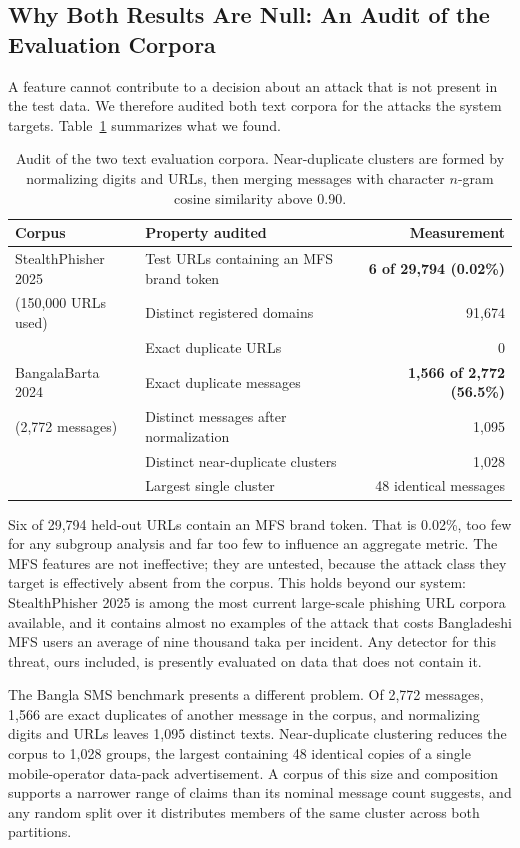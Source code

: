 \documentclass[preprint,12pt,number]{elsarticle}
\begin{document}
\subsection{Why Both Results Are Null: An Audit of the Evaluation Corpora}
A feature cannot contribute to a decision about an attack that is not present in the test data. We therefore audited both text corpora for the attacks the system targets. Table~\ref{tab:audit} summarizes what we found.

\begin{table}[t]
\centering
\caption{Audit of the two text evaluation corpora. Near-duplicate clusters are formed by normalizing digits and URLs, then merging messages with character $n$-gram cosine similarity above 0.90.}
\label{tab:audit}
\small
\begin{tabular}{llr}
\toprule
Corpus & Property audited & Measurement \\
\midrule
StealthPhisher 2025 & Test URLs containing an MFS brand token & \textbf{6 of 29{,}794 (0.02\%)} \\
(150{,}000 URLs used) & Distinct registered domains & 91{,}674 \\
 & Exact duplicate URLs & 0 \\
BangalaBarta 2024 & Exact duplicate messages & \textbf{1{,}566 of 2{,}772 (56.5\%)} \\
(2{,}772 messages) & Distinct messages after normalization & 1{,}095 \\
 & Distinct near-duplicate clusters & 1{,}028 \\
 & Largest single cluster & 48 identical messages \\
\bottomrule
\end{tabular}
\end{table}

Six of 29{,}794 held-out URLs contain an MFS brand token. That is 0.02\%, too few for any subgroup analysis and far too few to influence an aggregate metric. The MFS features are not ineffective; they are untested, because the attack class they target is effectively absent from the corpus. This holds beyond our system: StealthPhisher 2025 is among the most current large-scale phishing URL corpora available, and it contains almost no examples of the attack that costs Bangladeshi MFS users an average of nine thousand taka per incident. Any detector for this threat, ours included, is presently evaluated on data that does not contain it.

The Bangla SMS benchmark presents a different problem. Of 2{,}772 messages, 1{,}566 are exact duplicates of another message in the corpus, and normalizing digits and URLs leaves 1{,}095 distinct texts. Near-duplicate clustering reduces the corpus to 1{,}028 groups, the largest containing 48 identical copies of a single mobile-operator data-pack advertisement. A corpus of this size and composition supports a narrower range of claims than its nominal message count suggests, and any random split over it distributes members of the same cluster across both partitions.
\end{document}
